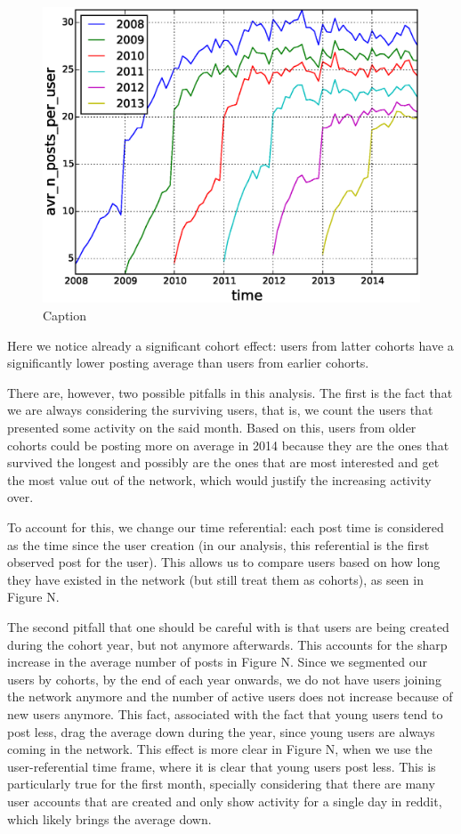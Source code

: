 \begin{figure}[!tb]
\centering
\includegraphics[scale=0.4]{./images/avr_posts_per_user_over_time_cohorts.eps}
\caption{Caption}
\label{fig:avr_posts_per_user_over_time_cohorts}
\end{figure}

Here we notice already a significant cohort effect: users from latter cohorts have a significantly lower posting average than users from earlier cohorts.

There are, however, two possible pitfalls in this analysis. The first is the fact that we are always considering the surviving users, that is, we count the users that presented some activity on the said month. Based on this, users from older cohorts could be posting more on average in 2014 because they are the ones that survived the longest and possibly are the ones that are most interested and get the most value out of the network, which would justify the increasing activity over.

To account for this, we change our time referential: each post time is considered as the time since the user creation (in our analysis, this referential is the first observed post for the user). This allows us to compare users based on how long they have existed in the network (but still treat them as cohorts), as seen in Figure N.

The second pitfall that one should be careful with is that users are being created during the cohort year, but not anymore afterwards. This accounts for the sharp increase in the average number of posts in Figure N. Since we segmented our users by cohorts, by the end of each year onwards, we do not have users joining the network anymore and the number of active users does not increase because of new users anymore. This fact, associated with the fact that young users tend to post less, drag the average down during the year, since young users are always coming in the network. This effect is more clear in Figure N, when we use the user-referential time frame, where it is clear that young users post less. This is particularly true for the first month, specially considering that there are many user accounts that are created and only show activity for a single day in reddit, which likely brings the average down.

